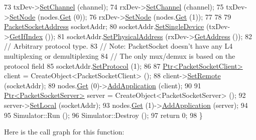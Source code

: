 \begin{DoxyCode}
73   txDev->\hyperlink{classns3_1_1SimpleNetDevice_af9e9828ad584b5ba538f18f645f162e0}{SetChannel} (channel);
74   rxDev->\hyperlink{classns3_1_1SimpleNetDevice_af9e9828ad584b5ba538f18f645f162e0}{SetChannel} (channel);
75   txDev->\hyperlink{classns3_1_1SimpleNetDevice_a7b0e64c1e4ee9841de0a892db96ddd68}{SetNode} (nodes.\hyperlink{classns3_1_1NodeContainer_a9ed96e2ecc22e0f5a3d4842eb9bf90bf}{Get} (0));
76   rxDev->\hyperlink{classns3_1_1SimpleNetDevice_a7b0e64c1e4ee9841de0a892db96ddd68}{SetNode} (nodes.\hyperlink{classns3_1_1NodeContainer_a9ed96e2ecc22e0f5a3d4842eb9bf90bf}{Get} (1));
77 
78 
79   \hyperlink{classns3_1_1PacketSocketAddress}{PacketSocketAddress} socketAddr;
80   socketAddr.\hyperlink{classns3_1_1PacketSocketAddress_ad1caa016f4d27c9d5f2c06dbfc53f8a3}{SetSingleDevice} (txDev->\hyperlink{classns3_1_1SimpleNetDevice_ad49c077636c82c11b3d76dcb12dfa203}{GetIfIndex} ());
81   socketAddr.\hyperlink{classns3_1_1PacketSocketAddress_a9452f9410a97e57344e464e25c2ab0f3}{SetPhysicalAddress} (rxDev->\hyperlink{classns3_1_1SimpleNetDevice_a813ed60e4386e8f46493a575f636606a}{GetAddress} ());
82   \textcolor{comment}{// Arbitrary protocol type.}
83   \textcolor{comment}{// Note: PacketSocket doesn't have any L4 multiplexing or demultiplexing}
84   \textcolor{comment}{//       The only mux/demux is based on the protocol field}
85   socketAddr.\hyperlink{classns3_1_1PacketSocketAddress_a9020962e39c238277f3b2f0de605647a}{SetProtocol} (1);
86 
87   \hyperlink{classns3_1_1Ptr}{Ptr<PacketSocketClient>} client = CreateObject<PacketSocketClient> ();
88   client->\hyperlink{classns3_1_1PacketSocketClient_ae400727c451d429358b5c85838b901df}{SetRemote} (socketAddr);
89   nodes.\hyperlink{classns3_1_1NodeContainer_a9ed96e2ecc22e0f5a3d4842eb9bf90bf}{Get} (0)->\hyperlink{classns3_1_1Node_ab98b4fdc4aadc86366b80e8a79a53f47}{AddApplication} (client);
90 
91   \hyperlink{classns3_1_1Ptr}{Ptr<PacketSocketServer>} server = CreateObject<PacketSocketServer> ();
92   server->\hyperlink{classns3_1_1PacketSocketServer_a89207b49054571b480ee1d26934907d3}{SetLocal} (socketAddr);
93   nodes.\hyperlink{classns3_1_1NodeContainer_a9ed96e2ecc22e0f5a3d4842eb9bf90bf}{Get} (1)->\hyperlink{classns3_1_1Node_ab98b4fdc4aadc86366b80e8a79a53f47}{AddApplication} (server);
94 
95   Simulator::Run ();
96   Simulator::Destroy ();
97   \textcolor{keywordflow}{return} 0;
98 \}
\end{DoxyCode}


Here is the call graph for this function\+:


